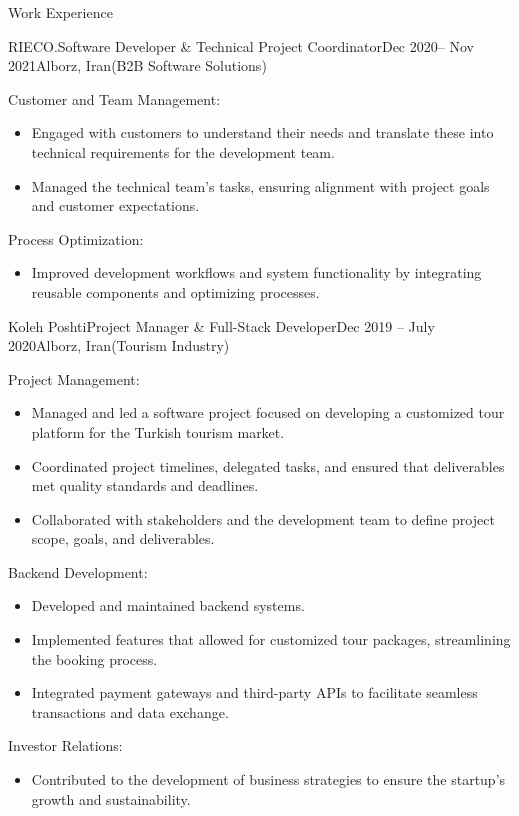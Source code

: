 \documentclass[]{kyvernitis-resume}
\begin{document}
\begin{section}{Work Experience}
\begin{subsection}{RIECO.}{Software Developer  \& Technical Project Coordinator}{Dec 2020-- Nov 2021}{Alborz, Iran}{(B2B Software Solutions)}
	\item Customer and Team Management:
		\begin{itemize}
			\item Engaged with customers to understand their needs and translate these into technical requirements for the development team.
			\item Managed the technical team’s tasks, ensuring alignment with project goals and customer expectations.
		\end{itemize}
	
	\item Process Optimization:
		\begin{itemize}
			\item Improved development workflows and system functionality by integrating reusable components and optimizing processes.
		\end{itemize}
    \end{subsection}
    
    \begin{subsection}{Koleh Poshti}{Project Manager \& Full-Stack Developer}{Dec 2019 -- July 2020}{Alborz, Iran}{(Tourism Industry)}

        	\item Project Management:
	\begin{itemize}
	\item Managed and led a software project focused on developing a customized tour platform for the Turkish tourism market.
	\item Coordinated project timelines, delegated tasks, and ensured that deliverables met quality standards and deadlines.
	\item Collaborated with stakeholders and the development team to define project scope, goals, and deliverables.
	\end{itemize}

        	\item Backend Development:
	\begin{itemize}
	\item Developed and maintained backend systems.
	\item Implemented features that allowed for customized tour packages, streamlining the booking process.
	\item Integrated payment gateways and third-party APIs to facilitate seamless transactions and data exchange.
	\end{itemize}

        	\item Investor Relations:
	\begin{itemize}
	\item Contributed to the development of business strategies to ensure the startup’s growth and sustainability.
	\end{itemize}


\end{subsection}
\end{section}
\end{document}
